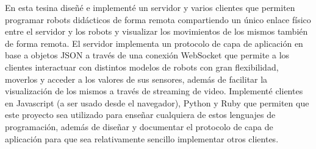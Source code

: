 % 
% 
%


En esta tesina diseñé e implementé un servidor y varios clientes que permiten
programar robots didácticos de forma remota compartiendo un único enlace
físico entre el servidor y los robots y visualizar los movimientos de los
mismos también de forma remota. El servidor implementa un protocolo de capa
de aplicación en base a objetos JSON a través de una conexión WebSocket que
permite a los clientes interactuar con distintos modelos de robots con gran
flexibilidad, moverlos y acceder a los valores de sus sensores, además de
facilitar la visualización de los mismos a través de streaming de video.
Implementé clientes en Javascript (a ser usado desde el navegador),
Python y Ruby que permiten que este proyecto sea utilizado para enseñar
cualquiera de estos lenguajes de programación, además de diseñar y documentar
el protocolo de capa de aplicación para que sea relativamente sencillo
implementar otros clientes.

